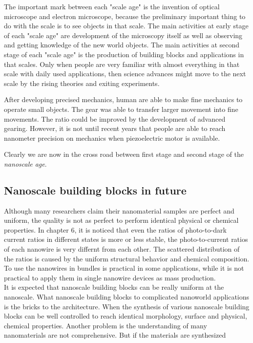 The important mark between each "scale age" is the invention of optical microscope and electron microscope, because the preliminary important thing to do with the scale is to see objects in that scale. The main activities at early stage of each "scale age" are development of the microscopy itself as well as observing and getting knowledge of the new world objects. The main activities at second stage of each "scale age" is the production of building blocks and applications in that scales. Only when people are very familiar with almost everything in that scale with daily used applications, then science advances might move to the next scale by the rising theories and exiting experiments. 


After developing precised mechanics, human are able to make fine mechanics to operate small objects. The gear was able to transfer larger movement into fine movements. The ratio could be improved by the development of advanced gearing. However, it is not until recent years that people are able to reach nanometer precision on mechanics when piezoelectric motor is available. \cite{} 

Clearly we are now in the cross road between first stage and second stage of the {\em nanoscale age}. 

\subsection{Nanoscale building blocks in future}
Although many researchers claim their nanomaterial samples are perfect and uniform, the quality is not as perfect to perform identical physical or chemical properties. In chapter 6, it is noticed that even the ratios of photo-to-dark current ratios in different states is more or less stable, the photo-to-current ratios of each nanowire is very differnt from each other. The scattered distribution of the ratios is caused by the uniform structural behavior and chemical composition. To use the nanowires in bundles is practical in some applications, while it is not practical to apply them in single nanowire devices as mass production. \\
It is expected that nanoscale building blocks can be really uniform at the nanoscale. What nanoscale building blocks to complicated nanoworld applications is the bricks to the architecture. When the synthesis of various nanoscale building blocks can be well controlled to reach identical morphology, surface and physical, chemical properties. 
Another problem is the understanding of many nanomaterials are not comprehensive. But if the materials are synthesized 

